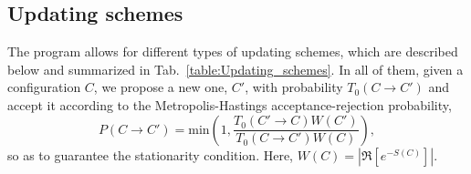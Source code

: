 
\subsection{Updating schemes}\label{sec:updating}
%
The program allows for different types of updating schemes, which are described below and summarized in Tab.~\ref{table:Updating_schemes}. In all of them, given a configuration $C$, we propose a new one, $C'$, with probability $T_0(C \rightarrow C')$  and accept it according to   the  Metropolis-Hastings   acceptance-rejection probability, 
\begin{equation}
	P(C \rightarrow C') =  \text{min}  \left( 1, \frac{T_0(C' \rightarrow C) W(C')}{T_0(C \rightarrow C') W(C)} \right),
\end{equation}
so as to guarantee the stationarity condition.  Here, $ W(C) = \left| \Re \left[ e^{-S(C)} \right] \right| $. 

